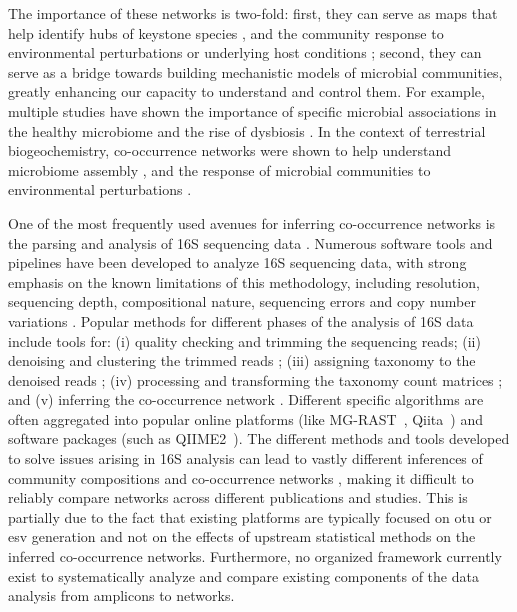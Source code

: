  The importance of these networks is two-fold: first, they can serve as maps that help identify hubs of keystone species \cite{Menon2018,Rottjers2018}, and the community response to environmental perturbations or underlying host conditions \cite{Gilbert2016}; second, they can serve as a bridge towards building mechanistic models of microbial communities, greatly enhancing our capacity to understand and control them.
 For example, multiple studies have shown the importance of specific microbial associations in the healthy microbiome \cite{Lloyd-Price2016,Wu2016,HumanMicrobiomeProjectConsortium2012} and the rise of dysbiosis \cite{Wang2017,Gilbert2016,Belizario2015}.
 In the context of terrestrial biogeochemistry, co-occurrence networks were shown to help understand microbiome assembly \cite{Fierer2017}, and  the response of microbial communities to environmental perturbations \cite{Jiao2019}.

One of the most frequently used avenues for inferring co-occurrence networks is the parsing and analysis of 16S sequencing data \cite{Rottjers2018,Friedman2012}.
Numerous software tools and pipelines have been developed to analyze 16S sequencing data, with strong emphasis on the known limitations of this methodology, including resolution, sequencing depth, compositional nature, sequencing errors and copy number variations \cite{Bharti2019,Pollock2018}.
Popular methods for different phases of the analysis of 16S data include tools for: (i) quality checking and trimming the sequencing reads; (ii) denoising and clustering the trimmed reads \cite{Caporaso2010,Callahan2016}; (iii) assigning taxonomy to the denoised reads \cite{DeSantis2006,Quast2012}; (iv) processing and transforming the taxonomy count matrices \cite{Weiss2015}; and (v) inferring the co-occurrence network \cite{Cougoul2019,Kurtz2015}.
Different specific algorithms are often aggregated into popular online platforms (like MG-RAST~\cite{Keegan2016}, Qiita~\cite{qiita}) and software packages (such as QIIME2~\cite{bolyenReproducibleInteractiveScalable2019}).
The different methods and tools developed to solve issues arising in 16S analysis can lead to vastly different inferences of community compositions and co-occurrence networks \cite{Golob2017,Weiss2016}, making it difficult to reliably compare networks across different publications and studies.
 This is partially due to the fact that existing platforms are typically focused on \ac{otu} or \ac{esv} generation and not on the effects of upstream statistical methods on the inferred co-occurrence networks.
 Furthermore, no organized framework currently exist to systematically analyze and compare existing components of the data analysis from amplicons to networks.

